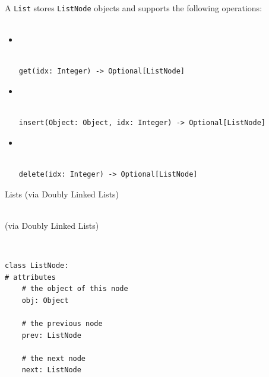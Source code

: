 \documentclass[mathserif, handout]{beamer}
\begin{document}
\begin{frame}[fragile]
	A \texttt{List} stores \texttt{ListNode} objects and supports the following operations:\\~\\
	\begin{itemize}
		\item {} \\
		      \\[-1mm]
		      \begin{lstlisting}[style=mypython]
get(idx: Integer) -> Optional[ListNode]
\end{lstlisting}

		\item {} \\
		      \\[-1mm]
		      \begin{lstlisting}[style=mypython]
insert(Object: Object, idx: Integer) -> Optional[ListNode]
\end{lstlisting}

		\item {} \\
		      \\[-1mm]
		      \begin{lstlisting}[style=mypython]
delete(idx: Integer) -> Optional[ListNode]
\end{lstlisting}
	\end{itemize}
\end{frame}

\begin{frame}{Lists (via Doubly Linked Lists)}
	\begin{center}
		\Large {} \\[1mm]
		\normalsize\color{gray} (via Doubly Linked Lists)
	\end{center}
\end{frame}

\begin{frame}[fragile]
	\begin{thmboxtop}
		 \\
		\begin{lstlisting}[style=mypython]
class ListNode:
# attributes
    # the object of this node
    obj: Object
    
    # the previous node
    prev: ListNode
    
    # the next node
    next: ListNode
\end{lstlisting}
	\end{thmboxtop}
\end{frame}
\end{document}
